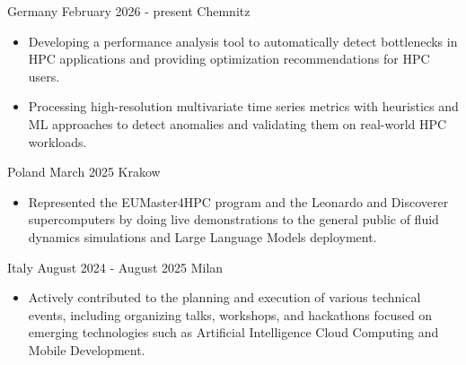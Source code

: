 

{Germany}
{February 2026 - present}
{Chemnitz}
{\footnotesize\faCode \hspace{1pt}      
}

\begin{itemize}
    \item Developing a performance analysis tool to automatically detect bottlenecks in HPC applications and providing optimization recommendations for HPC users.

    \item Processing high-resolution multivariate time series metrics with heuristics and ML approaches to detect anomalies and validating them on real-world HPC workloads.
    
    
\end{itemize}

\medskip

{Poland}
{March 2025}
{Krakow}
{\footnotesize\faCode \hspace{1pt}      
}

\begin{itemize}
    \item Represented the EUMaster4HPC program and the Leonardo and Discoverer supercomputers by doing live demonstrations to the general public of fluid dynamics simulations and Large Language Models deployment.
\end{itemize}

\medskip
 
        {Italy}
        {August 2024 - August 2025}
        {Milan}
        {\footnotesize\faCode \hspace{1pt}      
        }

        \begin{itemize}
              
             \item Actively contributed to the planning and execution of various technical events, including organizing talks, workshops, and hackathons focused on emerging technologies such as Artificial Intelligence Cloud Computing and Mobile Development.
             
        \end{itemize}

